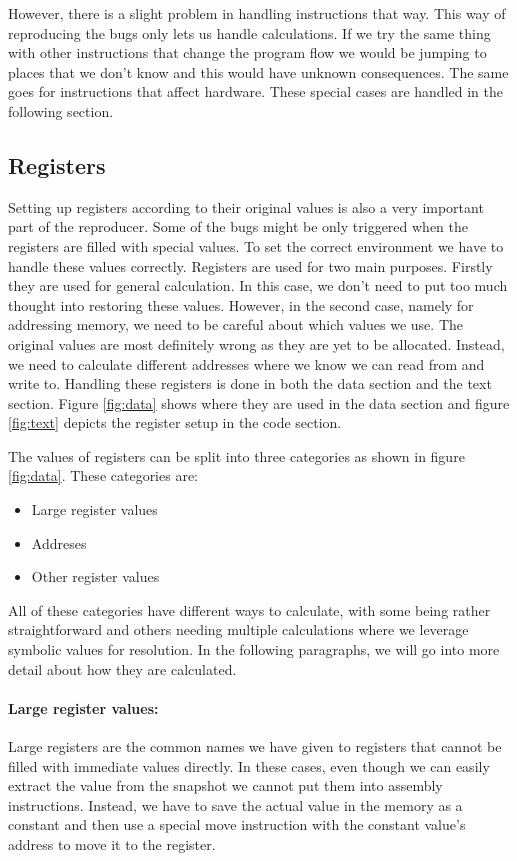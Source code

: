 However, there is a slight problem in handling instructions that way.
This way of reproducing the bugs only lets us handle calculations.
If we try the same thing with other instructions that change the program flow we would be jumping to places that we don't know and this would have unknown consequences.
The same goes for instructions that affect hardware.
These special cases are handled in the following section.

\subsection{Registers}
Setting up registers according to their original values is also a very important part of the reproducer.
Some of the bugs might be only triggered when the registers are filled with special values.
To set the correct environment we have to handle these values correctly.
Registers are used for two main purposes.
Firstly they are used for general calculation.
In this case, we don't need to put too much thought into restoring these values.
However, in the second case, namely for addressing memory, we need to be careful about which values we use.
The original values are most definitely wrong as they are yet to be allocated.
Instead, we need to calculate different addresses where we know we can read from and write to.
Handling these registers is done in both the data section and the text section.
Figure \ref{fig:data} shows where they are used in the data section and figure \ref{fig:text} depicts the register setup in the code section.

The values of registers can be split into three categories as shown in figure \ref{fig:data}.
These categories are:
\begin{itemize}
    \item Large register values
    \item Addreses
    \item Other register values
\end{itemize}
All of these categories have different ways to calculate, with some being rather straightforward and others needing multiple calculations where we leverage symbolic values for resolution.
In the following paragraphs, we will go into more detail about how they are calculated.

\paragraph{Large register values:}
Large registers are the common names we have given to registers that cannot be filled with immediate values directly.
In these cases, even though we can easily extract the value from the snapshot we cannot put them into assembly instructions.
Instead, we have to save the actual value in the memory as a constant and then use a special move instruction with the constant value's address to move it to the register.

